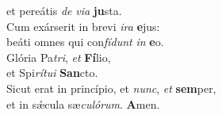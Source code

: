 \evenverse et pereátis \textit{de} \textit{vi}\textit{a} \textbf{ju}sta.\\
\oddverse Cum exárserit in brevi \textit{i}\textit{ra} \textbf{e}jus:~\*\\
\oddverse beáti omnes qui con\textit{fí}\textit{dunt} \textit{in} \textbf{e}o.\\
\evenverse Glória Pa\textit{tri}, \textit{et} \textbf{Fí}lio,~\*\\
\evenverse et Spi\textit{rí}\textit{tu}\textit{i} \textbf{San}cto.\\
\oddverse Sicut erat in princípio, et \textit{nunc}, \textit{et} \textbf{sem}per,~\*\\
\oddverse et in sǽcula sæ\textit{cu}\textit{ló}\textit{rum}. \textbf{A}men.\\
